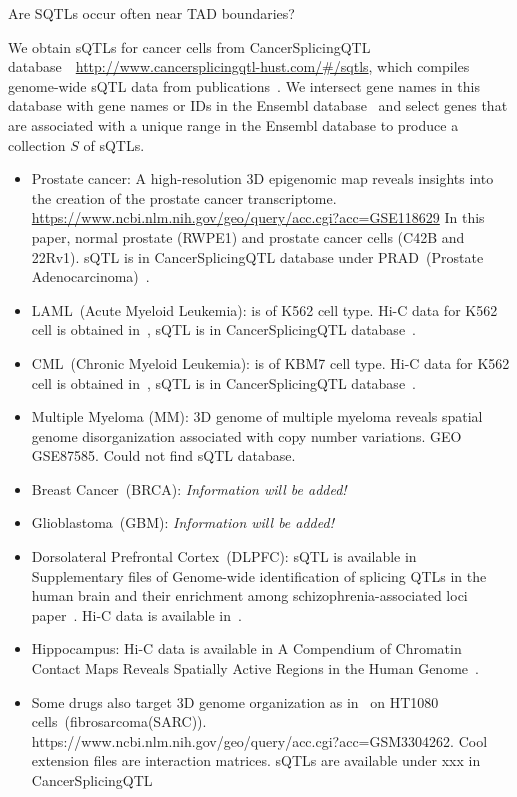 \documentclass[11pt]{article}
\begin{document}
Are SQTLs occur often near TAD boundaries?

We obtain sQTLs for cancer cells from CancerSplicingQTL database~\cite{tian2018}~\url{http://www.cancersplicingqtl-hust.com/#/sqtls}, which
compiles genome-wide sQTL data from publications~\cite{}. We intersect gene names in this
database with gene names or IDs in the Ensembl database~\cite{yates2019} and select genes that are associated with a
unique range in the Ensembl database to produce a collection $S$ of sQTLs.

\begin{itemize}
\item Prostate cancer: A high-resolution 3D epigenomic map reveals insights into the creation
of the prostate cancer transcriptome. \url{https://www.ncbi.nlm.nih.gov/geo/query/acc.cgi?acc=GSE118629}
In this paper, normal prostate (RWPE1) and prostate cancer cells (C42B
and 22Rv1). sQTL is in CancerSplicingQTL database under PRAD~(Prostate Adenocarcinoma)~\cite{tian2018}.
\vspace{0.1cm}
\item LAML~(Acute Myeloid Leukemia): is of K562 cell type. Hi-C data for K562 cell is obtained in~\cite{rao2014}, sQTL is in CancerSplicingQTL database~\cite{tian2018}.
\vspace{0.1cm}
\item CML~(Chronic Myeloid Leukemia): is of KBM7 cell type. Hi-C data
  for K562 cell is obtained in~\cite{rao2014}, sQTL is in
  CancerSplicingQTL database~\cite{tian2018}.
\vspace{0.1cm}
\item Multiple Myeloma (MM): $3$D genome of multiple myeloma reveals
  spatial genome disorganization associated with copy number
  variations. GEO GSE87585. Could not find sQTL database.
\vspace{0.1cm}
\item Breast Cancer~(BRCA): \textit{Information will be added!}
\vspace{0.1cm}
\item Glioblastoma~(GBM): \textit{Information will be added!}
\vspace{0.1cm}
\item Dorsolateral Prefrontal Cortex~(DLPFC): sQTL is available in
  Supplementary files of Genome-wide identification of splicing QTLs
  in the human brain and their enrichment among
  schizophrenia-associated loci paper~\cite{takata2017}. Hi-C data is
  available in~\cite{schmitt2016}.
  \vspace{0.1cm}
\item Hippocampus: Hi-C data is available in A Compendium of Chromatin Contact Maps Reveals Spatially Active Regions in the Human Genome~\cite{schmitt2016}.
\vspace{0.1cm}
\item Some drugs also target $3$D genome organization as
in~\cite{kantidze2019} on HT1080
cells~(fibrosarcoma(SARC)). https://www.ncbi.nlm.nih.gov/geo/query/acc.cgi?acc=GSM3304262. Cool extension
files are interaction matrices. sQTLs are available under xxx in
CancerSplicingQTL
\end{itemize}
\end{document}
